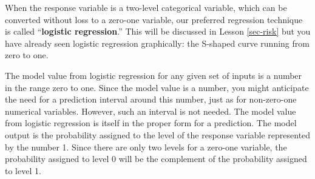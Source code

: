 \documentclass[
  letterpaper,
  DIV=11,
  numbers=noendperiod,
  oneside]{scrartcl}
\begin{document}
\begin{tcolorbox}[enhanced jigsaw, colbacktitle=quarto-callout-warning-color!10!white, opacityback=0, breakable, opacitybacktitle=0.6, colback=white, coltitle=black, arc=.35mm, title=\textcolor{quarto-callout-warning-color}{\faExclamationTriangle}\hspace{0.5em}{The model value from a logistic model \emph{is} the prediction.}, left=2mm, colframe=quarto-callout-warning-color-frame, rightrule=.15mm, bottomrule=.15mm, leftrule=.75mm, bottomtitle=1mm, toptitle=1mm, titlerule=0mm, toprule=.15mm]

When the response variable is a two-level categorical variable, which
can be converted without loss to a zero-one variable, our preferred
regression technique is called ``\textbf{logistic regression}.'' This
will be discussed in Lesson \ref{sec-risk} but you have already seen
logistic regression graphically: the S-shaped curve running from zero to
one.

The model value from logistic regression for any given set of inputs is
a number in the range zero to one. Since the model value is a number,
you might anticipate the need for a prediction interval around this
number, just as for non-zero-one numerical variables. However, such an
interval is not needed. The model value from logistic regression is
itself in the proper form for a prediction. The model output is the
probability assigned to the level of the response variable represented
by the number 1. Since there are only two levels for a zero-one
variable, the probability assigned to level 0 will be the complement of
the probability assigned to level 1.

\end{tcolorbox}
\end{document}
